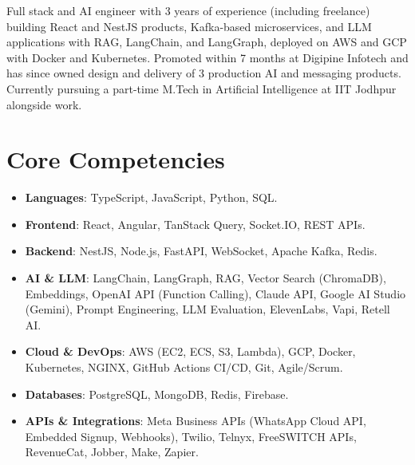 \documentclass[11pt,a4paper,sans]{moderncv}
\begin{document}
\makecvtitle


\vspace{6pt}
\small{Full stack and AI engineer with 3 years of experience (including freelance) building React and NestJS products, Kafka-based microservices, and LLM applications with RAG, LangChain, and LangGraph, deployed on AWS and GCP with Docker and Kubernetes. Promoted within 7 months at Digipine Infotech and has since owned design and delivery of 3 production AI and messaging products. Currently pursuing a part-time M.Tech in Artificial Intelligence at IIT Jodhpur alongside work.}


\section{Core Competencies}
\vspace{1pt}
\begin{itemize}

\item \textbf{Languages}: TypeScript, JavaScript, Python, SQL.

\item \textbf{Frontend}: React, Angular, TanStack Query, Socket.IO, REST APIs.

\item \textbf{Backend}: NestJS, Node.js, FastAPI, WebSocket, Apache Kafka, Redis.

\item \textbf{AI \& LLM}: LangChain, LangGraph, RAG, Vector Search (ChromaDB), Embeddings, OpenAI API (Function Calling), Claude API, Google AI Studio (Gemini), Prompt Engineering, LLM Evaluation, ElevenLabs, Vapi, Retell AI.

\item \textbf{Cloud \& DevOps}: AWS (EC2, ECS, S3, Lambda), GCP, Docker, Kubernetes, NGINX, GitHub Actions CI/CD, Git, Agile/Scrum.

\item \textbf{Databases}: PostgreSQL, MongoDB, Redis, Firebase.

\item \textbf{APIs \& Integrations}: Meta Business APIs (WhatsApp Cloud API, Embedded Signup, Webhooks), Twilio, Telnyx, FreeSWITCH APIs, RevenueCat, Jobber, Make, Zapier.

\end{itemize}
\end{document}
